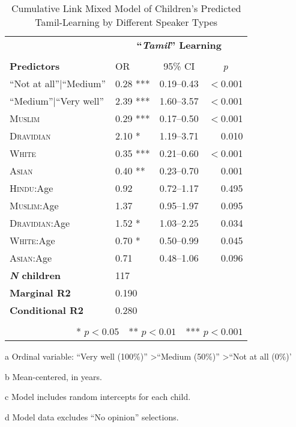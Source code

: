 \begin{table*}[t]
\small
\caption{Cumulative Link Mixed Model of Children's Predicted Tamil-Learning by Different Speaker Types}\label{tab:tamil-ord}
    \centering
    \vspace{5pt}
\begin{threeparttable}
\begin{tabular}{llcr}
 \toprule
& \multicolumn{3}{c}{\textbf{``\textit{Tamil}'' Learning}\tnote{a}} \\
\cline{2-4} \\[-.75em]
\textbf{Predictors} & {OR} & {95\% CI} & \multicolumn{1}{c}{\textit{p}} \\ 
\midrule
``Not at all''$|$``Medium'' & 0.28 *** & 0.19--0.43 & $<$0.001 \\ 
``Medium''$|$``Very well'' & 2.39 *** & 1.60--3.57 & $<$0.001 \\ 
  \textsc{Muslim} & 0.29 *** & 0.17--0.50 & $<$0.001 \\ 
  \textsc{Dravidian} & 2.10 * & 1.19--3.71 & 0.010 \\ 
  \textsc{White} & 0.35 *** & 0.21--0.60 & $<$0.001 \\ 
  \textsc{Asian} & 0.40 ** & 0.23--0.70 & 0.001 \\ 
\textsc{Hindu}:Age\tnote{b}  & 0.92 & 0.72--1.17 & 0.495 \\ 
  \textsc{Muslim}:Age & 1.37 & 0.95--1.97 & 0.095 \\ 
  \textsc{Dravidian}:Age & 1.52 * & 1.03--2.25 & 0.034 \\ 
  \textsc{White}:Age & 0.70 * & 0.50--0.99 & 0.045 \\ 
  \textsc{Asian}:Age & 0.71 & 0.48--1.06 & 0.096 \\ 
\midrule
\bfseries{\textit{N} children}\tnote{c} & 117 &  &  \\ 
 \textbf{Marginal R2} & 0.190 && \\ 
 \textbf{Conditional R2} & 0.280 &  &  \\
\bottomrule\\[-.75em]
\multicolumn{4}{r}{* $p<0.05$~~** $p<0.01$~~*** $p<0.001$}\\
\end{tabular}
\begin{tablenotes}[flushleft]
    \item[a] Ordinal variable: ``Very well (100\%)'' \textgreater ``Medium (50\%)'' \textgreater ``Not at all (0\%)'
    \item[b] Mean-centered, in years.
    \item[c] Model includes random intercepts for each child.
    \item[d] Model data excludes ``No opinion'' selections. 
\end{tablenotes}
\end{threeparttable}
\end{table*}